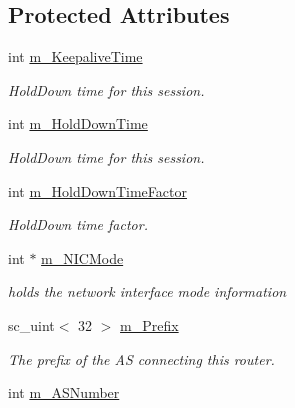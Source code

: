 \subsection*{Protected Attributes}
\begin{DoxyCompactItemize}
\item 
int \hyperlink{classBGPSessionParameters_a465c4710f73834f9d0daaf9defe6ccc8}{m\-\_\-\-Keepalive\-Time}
\begin{DoxyCompactList}\small\item\em Hold\-Down time for this session. \end{DoxyCompactList}\item 
int \hyperlink{classBGPSessionParameters_aadc4f5c38dc8e8d4765391aaad8b5c5c}{m\-\_\-\-Hold\-Down\-Time}
\begin{DoxyCompactList}\small\item\em Hold\-Down time for this session. \end{DoxyCompactList}\item 
int \hyperlink{classBGPSessionParameters_a363e577b5765ea3c0bafa2b7a66efa7a}{m\-\_\-\-Hold\-Down\-Time\-Factor}
\begin{DoxyCompactList}\small\item\em Hold\-Down time factor. \end{DoxyCompactList}\item 
\hypertarget{classBGPSessionParameters_a817cad3f0d23762e4bfe5d0e38d82ea4}{int $\ast$ \hyperlink{classBGPSessionParameters_a817cad3f0d23762e4bfe5d0e38d82ea4}{m\-\_\-\-N\-I\-C\-Mode}}\label{classBGPSessionParameters_a817cad3f0d23762e4bfe5d0e38d82ea4}

\begin{DoxyCompactList}\small\item\em holds the network interface mode information \end{DoxyCompactList}\item 
\hypertarget{classBGPSessionParameters_a010fa1f90adcad91d8e1ba027b88860a}{sc\-\_\-uint$<$ 32 $>$ \hyperlink{classBGPSessionParameters_a010fa1f90adcad91d8e1ba027b88860a}{m\-\_\-\-Prefix}}\label{classBGPSessionParameters_a010fa1f90adcad91d8e1ba027b88860a}

\begin{DoxyCompactList}\small\item\em The prefix of the A\-S connecting this router. \end{DoxyCompactList}\item 
\hypertarget{classBGPSessionParameters_a9c063d3534b94fc0987f4942380a1657}{int \hyperlink{classBGPSessionParameters_a9c063d3534b94fc0987f4942380a1657}{m\-\_\-\-A\-S\-Number}}\label{classBGPSessionParameters_a9c063d3534b94fc0987f4942380a1657}


\end{DoxyCompactItemize}
